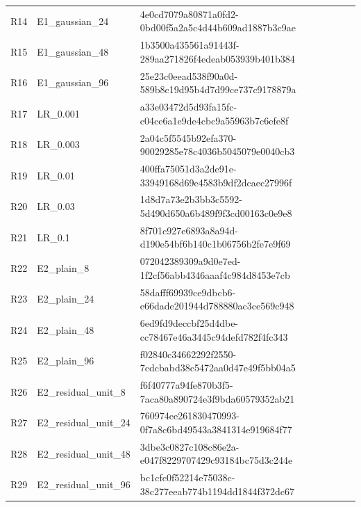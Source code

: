\documentclass[10pt,a4paper]{article}
\begin{document}
{\begin{longtable}{p{7mm}p{43mm}p{103mm}}
R14 & E1\_gaussian\_24 & {\ttfamily 4e0cd7079a80871a0fd2-0bd00f5a2a5c4d44b609ad1887b3c9ae} \\

R15 & E1\_gaussian\_48 & {\ttfamily 1b3500a435561a91443f-289aa271826f4edeab053939b401b384} \\

R16 & E1\_gaussian\_96 & {\ttfamily 25e23c0eead538f90a0d-589b8c19d95b4d7d99ce737c9178879a} \\

R17 & LR\_0.001 & {\ttfamily a33e03472d5d93fa15fc-c04ce6a1e9de4cbc9a55963b7c6efe8f} \\

R18 & LR\_0.003 & {\ttfamily 2a04c5f5545b92efa370-90029285e78c4036b5045079e0040cb3} \\

R19 & LR\_0.01 & {\ttfamily 400ffa75051d3a2de91e-33949168d69e4583b9df2dcaec27996f} \\

R20 & LR\_0.03 & {\ttfamily 1d8d7a73e2b3bb3c5592-5d490d650a6b489f9f3cd00163c0e9e8} \\

R21 & LR\_0.1 & {\ttfamily 8f701c927e6893a8a94d-d190e54bf6b140c1b06756b2fe7e9f69} \\

R22 & E2\_plain\_8 & {\ttfamily 072042389309a9d0e7ed-1f2cf56abb4346aaaf4c984d8453e7cb} \\

R23 & E2\_plain\_24 & {\ttfamily 58dafff69939ce9dbcb6-e66dade201944d788880ac3ce569c948} \\

R24 & E2\_plain\_48 & {\ttfamily 6ed9fd9deccbf25d4dbe-cc78467e46a3445c94defd782f4fc343} \\

R25 & E2\_plain\_96 & {\ttfamily f02840c34662292f2550-7cdcbabd38c5472aa0d47e49f5bb04a5} \\

R26 & E2\_residual\_unit\_8 & {\ttfamily f6f40777a94fe870b3f5-7aca80a890724e3f9bda60579352ab21} \\

R27 & E2\_residual\_unit\_24 & {\ttfamily 760974ee261830470993-0f7a8c6bd49543a3841314e919684f77} \\

R28 & E2\_residual\_unit\_48 & {\ttfamily 3dbe3c0827c108c86e2a-e047f8229707429c93184bc75d3c244e} \\

R29 & E2\_residual\_unit\_96 & {\ttfamily bc1cfc0f52214e75038c-38c277eeab774b1194dd1844f372dc67} \\


\end{longtable}}
\end{document}
